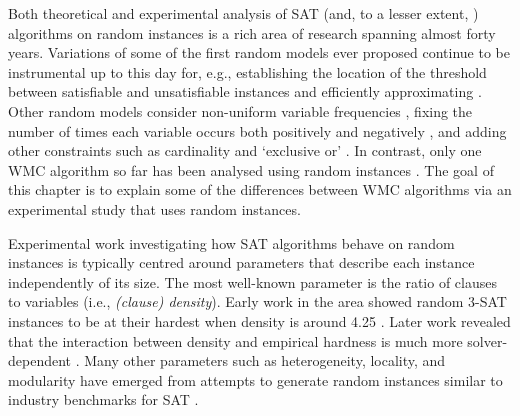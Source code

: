 Both theoretical and experimental analysis of SAT (and, to a lesser extent,
\mc{}) algorithms on random instances is a rich area of research spanning almost
forty years. Variations of some of the first random models ever proposed
\citep{DBLP:journals/dam/FrancoP83,DBLP:journals/siamcomp/PurdomB83} continue to
be instrumental up to this day for, e.g., establishing the location of the
threshold between satisfiable and unsatisfiable instances
\citep{DBLP:conf/focs/AchlioptasM02} and efficiently approximating \mc{}
\citep{DBLP:conf/icalp/GalanisG0Y20}. Other random models consider non-uniform
variable frequencies \citep{DBLP:conf/ijcai/AnsoteguiBL09}, fixing the number of
times each variable occurs both positively and negatively
\citep{DBLP:journals/cpc/Coja-OghlanW18}, and adding other constraints such as
cardinality and `exclusive or' \citep{DBLP:conf/ijcai/PoteJM19}. In contrast,
only one WMC algorithm so far has been analysed using random instances
\citep{DBLP:conf/sat/SangBBKP04,DBLP:conf/sat/SangBK05}. The goal of this
chapter is to explain some of the differences between WMC algorithms via an
experimental study that uses random instances.

Experimental work investigating how SAT algorithms behave on random instances is
typically centred around parameters that describe each instance independently of
its size. The most well-known parameter is the ratio of clauses to variables
(i.e., \emph{(clause) density}). Early work in the area showed random 3-SAT
instances to be at their hardest when density is around 4.25
\citep{DBLP:conf/aaai/MitchellSL92}. Later work revealed that the interaction
between density and empirical hardness is much more solver-dependent
\citep{DBLP:journals/constraints/CoarfaDASV03}. Many other parameters such as
heterogeneity, locality, and modularity have emerged from attempts to generate
random instances similar to industry benchmarks for SAT
\citep{DBLP:conf/ijcai/AnsoteguiBL09,DBLP:conf/tacas/BlasiusFS19,DBLP:journals/ai/Giraldez-CruL16,DBLP:conf/ijcai/Giraldez-CruL17}.

